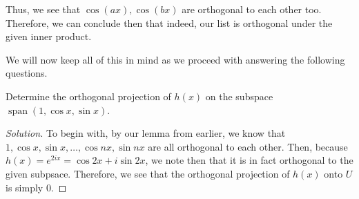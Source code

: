 \documentclass{article}
\newenvironment{solution}{\begin{proof}[Solution]}{\end{proof}}
\renewcommand\qedsymbol{$\blacksquare$}
\newenvironment{innerproof}{\renewcommand{\qedsymbol}{$\square$}\proof}{\endproof}
\newcommand{\norm}[1]{\left\lVert{#1}\right\rVert}
\DeclareMathOperator*{\vspan}{\mathrm{span}}
\newcommand{\innerproduct}[2]{\left\langle{#1}, {#2}\right\rangle}
\begin{document}
\begin{innerproof}
		Thus, we see that $\cos(ax), \cos(bx)$ are orthogonal to each other too. Therefore, we can conclude then that indeed, our list is orthogonal under the given inner product.
	\end{innerproof}
	
	\begin{comment}
		From here then, we want to simply normalise the basis for our given subspace. To do this, we make note of the following observation:
	\begin{lem}
		For $\cos(ax)$ and $\sin(ax)$, we have the following:
		\begin{align*}
			\norm{\cos(ax)} = \norm{\sin(ax)} = \sqrt{\pi}.
		\end{align*}
	\end{lem}
	\begin{innerproof}
		We observe the following:
		\begin{align*}
			\norm{\cos(ax)} &= \sqrt{\innerproduct{\cos(ax)}{\cos(ax)}} \\
			&= \sqrt{\int_{-\pi}^{\pi} \cos(ax)^{2}} \\
			&= \sqrt{\pi} \\
			&= \sqrt{\int_{-\pi}^{\pi} \sin(ax)^{2}} \\
			&= \sqrt{\innerproduct{\sin(ax)}{\sin(ax)}} \\
			&= \norm{\sin(ax)}.
		\end{align*}
	\end{innerproof}
	
	We also note here that $\norm{1} = \sqrt{\innerproduct{1}{1}} = \sqrt{2\pi}$.
	\end{comment}
	
	We will now keep all of this in mind as we proceed with answering the following questions.
	\begin{hw}
		Determine the orthogonal projection of $h(x)$ on the subspace $\vspan(1, \cos x, \sin x)$.
	\end{hw}
	\begin{solution}
		To begin with, by our lemma from earlier, we know that $1, \cos x, \sin x, \ldots, \cos nx, \sin nx$ are all orthogonal to each other. Then, because $h(x) = e^{2ix} = \cos 2x + i\sin 2x$, we note then that it is in fact orthogonal to the given subpsace. Therefore, we see that the orthogonal projection of $h(x)$ onto $U$ is simply $0$.
	\end{solution}
	
\end{document}
